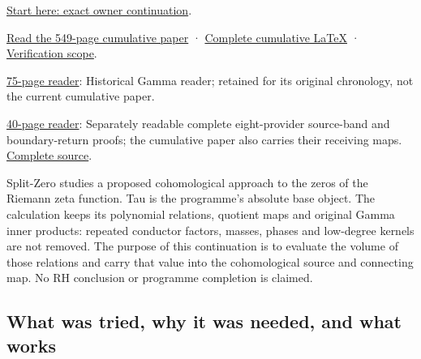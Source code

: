 \documentclass[
]{article}
\begin{document}
\href{https://github.com/KokunoYumeto/zeta-function-research-reader/blob/main/workbenches/splitzero-tandem/continuations/20260915-primitive-band-continuation/00_CONTINUE_HERE.md}{Start
here: exact owner continuation}.

\href{https://github.com/KokunoYumeto/zeta-function-research-reader/blob/main/workbenches/splitzero-tandem/continuations/20260915-primitive-band-continuation/15_CURRENT_MIXED_CONTROL_READER.pdf}{Read
the 549-page cumulative paper} ·
\href{https://github.com/KokunoYumeto/zeta-function-research-reader/blob/main/workbenches/splitzero-tandem/continuations/20260915-primitive-band-continuation/14_CURRENT_KERNEL_AND_MULTIPLICITY_PROOFS.tex}{Complete
cumulative LaTeX} ·
\href{https://github.com/KokunoYumeto/zeta-function-research-reader/blob/main/workbenches/splitzero-tandem/continuations/20260915-primitive-band-continuation/12_VALIDATION.md}{Verification
scope}.

\href{https://github.com/KokunoYumeto/zeta-function-research-reader/blob/main/workbenches/splitzero-tandem/continuations/20260915-primitive-band-continuation/01_GAMMA_READER.pdf}{75-page
reader}: Historical Gamma reader; retained for its original chronology,
not the current cumulative paper.

\href{https://github.com/KokunoYumeto/zeta-function-research-reader/blob/main/workbenches/splitzero-tandem/continuations/20260915-primitive-band-continuation/18_PRIMITIVE_CONNECTING_READER.pdf}{40-page
reader}: Separately readable complete eight-provider source-band and
boundary-return proofs; the cumulative paper also carries their
receiving maps.
\href{https://github.com/KokunoYumeto/zeta-function-research-reader/blob/main/workbenches/splitzero-tandem/continuations/20260915-primitive-band-continuation/17_FULL_PRIMITIVE_CONNECTING_PROOFS.tex}{Complete
source}.

Split-Zero studies a proposed cohomological approach to the zeros of the
Riemann zeta function. Tau is the programme's absolute base object. The
calculation keeps its polynomial relations, quotient maps and original
Gamma inner products: repeated conductor factors, masses, phases and
low-degree kernels are not removed. The purpose of this continuation is
to evaluate the volume of those relations and carry that value into the
cohomological source and connecting map. No RH conclusion or programme
completion is claimed.

\subsection{What was tried, why it was needed, and what
works}\label{what-was-tried-why-it-was-needed-and-what-works}
\end{document}

